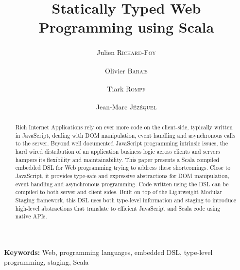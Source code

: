 \documentclass[american,english,runningheads]{llncs}
\newcommand{\etal}{\emph{et al.~}}
\newcommand{\noun}[1]{\textsc{#1}}
\begin{document}
\setcounter{lstlisting}{0}
\renewcommand{\thelstlisting}{\arabic{lstlisting}}

\title{Statically Typed Web Programming using Scala}

\author{Julien \noun{Richard-Foy}\textsuperscript{\textasteriskcentered}\textsuperscript{\textdaggerdbl} \and Olivier
\noun{Barais}\textsuperscript{\textasteriskcentered} \and Tiark \noun{Rompf}\textsuperscript{\textdagger} \and
Jean-Marc \noun{Jézéquel}\textsuperscript{\textasteriskcentered}}

\authorrunning{Julien \noun{Richard-Foy} \etal{}}

\maketitle


\begin{abstract}
\vspace*{-0.7cm}
Rich Internet Applications rely on ever more code on the client-side, typically written in JavaScript, dealing with
DOM manipulation, event handling and asynchronous calls to the server. Beyond well documented JavaScript programming
intrinsic issues, the hard wired distribution of an application business logic across clients and servers hampers its
flexibility and maintainability. This paper presents a Scala compiled embedded DSL for Web programming trying to
address these shortcomings. Close to JavaScript, it provides type-safe and expressive abstractions for DOM
manipulation, event handling and asynchronous programming. Code written using the DSL can be compiled to both server
and client sides. Built on top of the Lightweight Modular Staging framework, this DSL uses both type-level information
and staging to  introduce high-level abstractions that translate to efficient JavaScript and Scala code using native
APIs.
\end{abstract}
\vspace*{-0.3cm}
{\bf Keywords:} Web, programming languages, embedded DSL, type-level programming, staging, Scala
\end{document}
